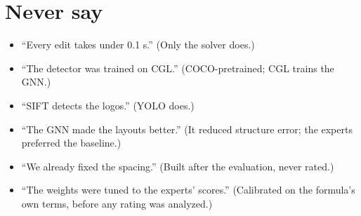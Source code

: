 \documentclass[10pt,a4paper]{article}
\begin{document}
\section{Never say}
\begin{itemize}
\item ``Every edit takes under 0.1 s.'' (Only the solver does.)
\item ``The detector was trained on CGL.'' (COCO-pretrained; CGL trains the GNN.)
\item ``SIFT detects the logos.'' (YOLO does.)
\item ``The GNN made the layouts better.'' (It reduced structure error; the experts preferred the baseline.)
\item ``We already fixed the spacing.'' (Built after the evaluation, never rated.)
\item ``The weights were tuned to the experts' scores.'' (Calibrated on the formula's own terms, before any rating was analyzed.)
\end{itemize}
\end{document}
